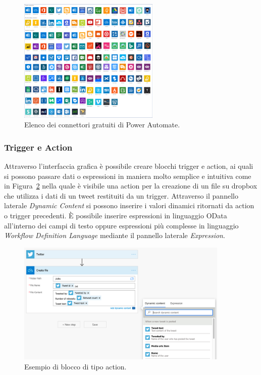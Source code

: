 \begin{figure}[ht!]
  \centering
  \includegraphics[width=0.6\textwidth]{connectors.png}
  \caption{Elenco dei connettori gratuiti di Power Automate.}
  \label{fig:connectors}
\end{figure}

\subsubsection{Trigger e Action}
Attraverso l'interfaccia grafica è possibile creare blocchi trigger e action, ai quali si possono passare dati o espressioni in maniera molto semplice e intuitiva come in Figura~\ref{fig:actionExample} nella quale è visibile una action per la creazione di un file su dropbox che utilizza i dati di un tweet restituiti da un trigger. Attraverso il pannello laterale \textit{Dynamic Content} si possono inserire i valori dinamici ritornati da action o trigger precedenti. È possibile inserire espressioni in linguaggio OData all'interno dei campi di testo oppure espressioni più complesse  in linguaggio \textit{Workflow Definition Language} mediante il pannello laterale \textit{Expression}.~\cite{WorkflowDefinitioLanguage}
\begin{figure}[ht]
  \centering
  \includegraphics[width=0.9\textwidth]{action-example.png}
  \caption{Esempio di blocco di tipo action.}
  \label{fig:actionExample}
\end{figure}

